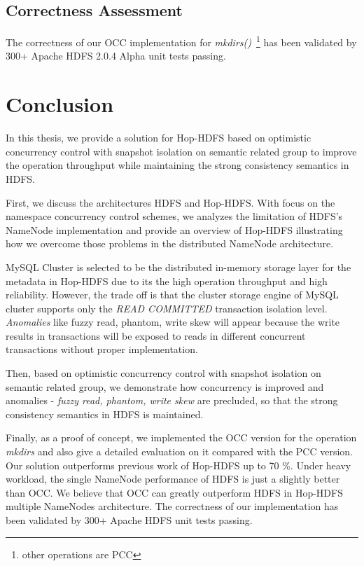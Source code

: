 \documentclass[runningheads,a4paper]{llncs}
\begin{document}
\subsection{Correctness Assessment}
The correctness of our OCC implementation for \textit{mkdirs()}~\footnote{other operations are PCC} has been validated by 300+ Apache HDFS 2.0.4 Alpha unit tests passing.

\section{Conclusion}
In this thesis, we provide a solution for Hop-HDFS based on optimistic concurrency control with snapshot isolation on semantic related group to improve the operation throughput while maintaining the strong consistency semantics in HDFS.

First, we discuss the architectures HDFS and Hop-HDFS. With focus on the namespace concurrency control schemes, we analyzes the limitation of HDFS's NameNode implementation and provide an overview of Hop-HDFS illustrating how we overcome those problems in the distributed NameNode architecture.

MySQL Cluster is selected to be the distributed in-memory storage layer for the metadata in Hop-HDFS due to its the high operation throughput and high reliability. However, the trade off is that the cluster storage engine of MySQL cluster supports only the \textit{READ COMMITTED} transaction isolation level. \textit{Anomalies} like fuzzy read, phantom, write skew will appear because the write results in transactions will be exposed to reads in different concurrent transactions without proper implementation.

Then, based on optimistic concurrency control with snapshot isolation on semantic related group, we demonstrate how concurrency is improved and anomalies - \textit{fuzzy read, phantom, write skew} are precluded, so that the strong consistency semantics in HDFS is maintained.

Finally, as a proof of concept, we implemented the OCC version for the operation \textit{mkdirs} and also give a detailed evaluation on it compared with the PCC version. Our solution outperforms previous work of Hop-HDFS up to 70 \%. Under heavy workload, the single NameNode performance of HDFS is just a slightly better than OCC. We believe that OCC can greatly outperform HDFS in Hop-HDFS multiple NameNodes architecture. The correctness of our implementation has been validated by 300+ Apache HDFS unit tests passing.
\end{document}
